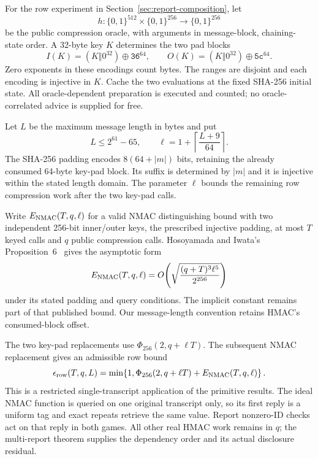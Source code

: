 For the row experiment in Section~\ref{sec:report-composition}, let
\[
 h:\{0,1\}^{512}\times\{0,1\}^{256}\longrightarrow\{0,1\}^{256}
\]
be the public compression oracle, with arguments in message-block,
chaining-state order. A 32-byte key $K$ determines the two pad blocks
\[
 I(K)=(K\Vert0^{32})\oplus\mathtt{36}^{64},\qquad
 O(K)=(K\Vert0^{32})\oplus\mathtt{5c}^{64}.
\]
Zero exponents in these encodings count bytes. The ranges are disjoint and
each encoding is injective in $K$. Cache the two evaluations at the fixed
SHA-256 initial state. All oracle-dependent preparation is executed and
counted; no oracle-correlated advice is supplied for free.

Let $L$ be the maximum message length in bytes and put
\[
 L\le2^{61}-65,\qquad
 \ell=1+\left\lceil\frac{L+9}{64}\right\rceil.
\]
The SHA-256 padding encodes $8(64+|m|)$ bits, retaining the already consumed
64-byte key-pad block. Its suffix is determined by $|m|$ and it is injective
within the stated length domain. The parameter $\ell$ bounds the remaining
row compression work after the two key-pad calls.

Write $E_{\rm NMAC}(T,q,\ell)$ for a valid NMAC distinguishing bound with two
independent 256-bit inner/outer keys, the prescribed injective padding, at
most $T$ keyed calls and $q$ public compression calls. Hosoyamada and Iwata's
Proposition~6~\cite{hmacqrom2021} gives the asymptotic form
\[
 E_{\rm NMAC}(T,q,\ell)
 =O\!\left(\sqrt{\frac{(q+T)^3\ell^5}{2^{256}}}\right)
\]
under its stated padding and query conditions. The implicit constant remains
part of that published bound. Our message-length convention retains HMAC's
consumed-block offset.

The two key-pad replacements use $\Phi_{256}(2,q+\ell T)$. The subsequent
NMAC replacement gives an admissible row bound
\[
 \epsilon_{\rm row}(T,q,L)
 =\min\!\left\{1,
 \Phi_{256}(2,q+\ell T)+E_{\rm NMAC}(T,q,\ell)\right\}.
\]
This is a restricted single-transcript application of the primitive results.
The ideal NMAC function is queried on one original transcript only, so its
first reply is a uniform tag and exact repeats retrieve the same value.
Report nonzero-ID checks act on that reply in both games. All other real
HMAC work remains in $q$; the multi-report theorem supplies the dependency
order and its actual disclosure residual.
